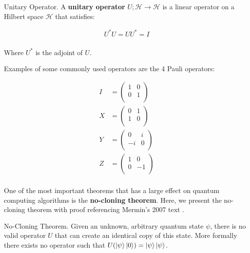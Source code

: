 \begin{definition}{Unitary Operator.}
    A \textbf{unitary operator} $U;\mathcal{H} \to \mathcal{H}$ is a linear operator on a Hilbert space $\mathcal{H}$ that satisfies:
    
    \begin{align*}
        U^*U = UU^* = I \\ 
    \end{align*}
    
    Where $U^*$ is the adjoint of $U$.
\end{definition}

Examples of some commonly used operators are the 4 Pauli operators:

\begin{align*}
    I &= \begin{pmatrix}
        1 & 0 \\ 
        0 & 1 \\ 
    \end{pmatrix} \\ 
    X &= \begin{pmatrix}
        0 & 1 \\ 
        1 & 0 \\ 
    \end{pmatrix} \\ 
    Y &= \begin{pmatrix}
        0 & i \\ 
        -i & 0 \\ 
    \end{pmatrix} \\ 
    Z &= \begin{pmatrix}
        1 & 0 \\ 
        0 & -1 \\ 
    \end{pmatrix} \\ 
\end{align*}

One of the most important theorems that has a large effect on quantum computing algorithms is the \textbf{no-cloning theorem}. Here, we present the no-cloning theorem with proof referencing Mermin's 2007 text \cite{merlin}.

\begin{theorem}{No-Cloning Theorem.}
    \label{thm:no-cloning-thm}
    Given an unknown, arbitrary quantum state $\psi$, there is no valid operator $U$ that can create an identical copy of this state. More formally there exists no operator such that $U(\ket{\psi} \ket{0}) = \ket{\psi}\ket{\psi}$.
\end{theorem}

